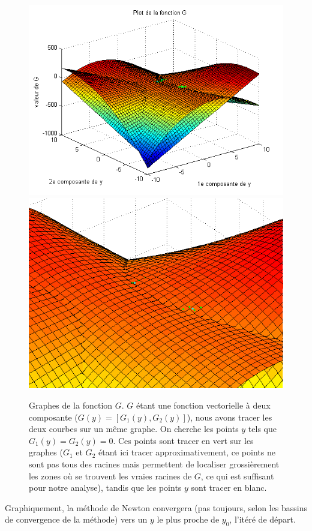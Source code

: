 \begin{figure}
\centering
\includegraphics[width=12cm]{grapheG.png}\\
\includegraphics[width=12cm]{grapheG2.png}
\caption{Graphes de la fonction $G$. $G$ étant une fonction vectorielle à deux composante ($G(y)=[G_1(y), G_2(y)]$), nous avons tracer les deux courbes sur un même graphe. On cherche les points $y$ tels que $G_1(y)=G_2(y)=0$. Ces points sont tracer en vert sur les graphes ($G_1$ et $G_2$ étant ici tracer approximativement, ce points ne sont pas tous des racines mais permettent de localiser grossièrement les zones où se trouvent les vraies racines de $G$, ce qui est suffisant pour notre analyse), tandis que les points $y$ sont tracer en blanc.}
\label{grapheG}
\end{figure}
Graphiquement, la méthode de Newton convergera (pas toujours, selon les bassins de convergence de la méthode) vers un $y$ le plus proche de $y_0$, l'itéré de départ.\\



